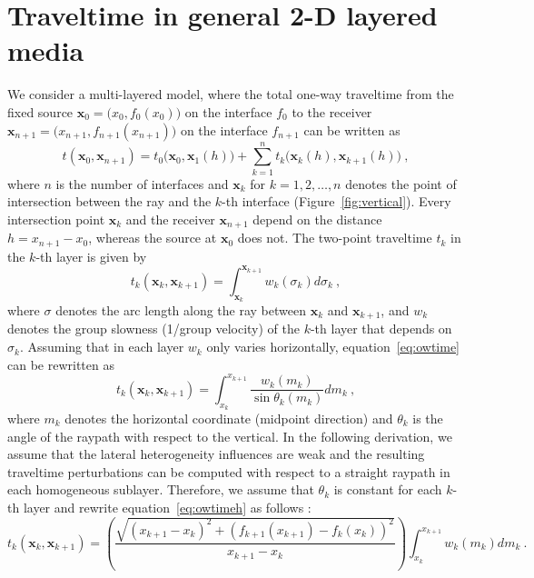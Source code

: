 \section{Traveltime in general 2-D layered media}
We consider a multi-layered model, where the total one-way traveltime from the fixed source $\mathbf{x}_0= \big(x_0,f_0(x_0)\big)$ on the interface $f_0$ to the receiver $\mathbf{x}_{n+1}= \big(x_{n+1},f_{n+1}(x_{n+1})\big)$ on the interface $f_{n+1}$ can be written as
\begin{equation}
  \label{eq:sum}
  t(\mathbf{x}_0,\mathbf{x}_{n+1}) = t_0\big(\mathbf{x}_0,\mathbf{x}_{1}(h)\big) + \sum\limits_{k=1}^{n} t_{k}\big(\mathbf{x}_k(h),\mathbf{x}_{k+1}(h)\big)~,  
\end{equation}
where $n$ is the number of interfaces and $\mathbf{x}_k$ for $k=1,2,\ldots,n$ denotes the point of intersection between the ray and 
the $k$-th interface (Figure~\ref{fig:vertical}). Every intersection point $\mathbf{x}_k$ and the receiver $\mathbf{x}_{n+1}$ depend on the distance $h = x_{n+1}-x_0 $, whereas the source at $\mathbf{x}_0$ does not. The two-point traveltime $t_{k}$ in the $k$-th layer is given by
\begin{equation}
\label{eq:owtime}
t_k (\mathbf{x}_k,\mathbf{x}_{k+1}) =  \int^{\mathbf{x}_{k+1}}_{\mathbf{x}_k} w_k(\sigma_k) d\sigma_k ~,
\end{equation}
where $\sigma$ denotes the arc length along the ray between $\mathbf{x}_k$ and $\mathbf{x}_{k+1}$, and $w_k$ denotes the group slowness (1/group velocity) of the $k$-th layer that depends on $\sigma_k$. Assuming that in each layer $w_k$ only varies horizontally, equation~\ref{eq:owtime} can be rewritten as
\begin{equation}
\label{eq:owtimeh}
t_k (\mathbf{x}_k,\mathbf{x}_{k+1}) = \int^{x_{k+1}}_{x_k} \frac{w_k(m_k)}{\sin \theta_k (m_k)} dm_k ~,
\end{equation}
where $m_k$ denotes the horizontal coordinate (midpoint direction) and $\theta_k$ is the angle of the raypath with respect to the vertical. In the following derivation, we assume that the lateral heterogeneity influences are weak and the resulting traveltime perturbations can be computed with respect to a straight raypath in each homogeneous sublayer. Therefore, we assume that $\theta_k$ is constant for each $k$-th layer and rewrite equation~\ref{eq:owtimeh} as follows \cite[]{lynnclaerbout,grechkatsvankinlatvar}:
\begin{equation}
\label{eq:owtimehor}
t_k (\mathbf{x}_k,\mathbf{x}_{k+1}) =  \left(\frac{\sqrt{(x_{k+1}-x_k)^2 + (f_{k+1}(x_{k+1})-f_k(x_k))^2 }}{x_{k+1}-x_k} \right)\int^{x_{k+1}}_{x_k} w_k(m_k) dm_k ~.
\end{equation}

